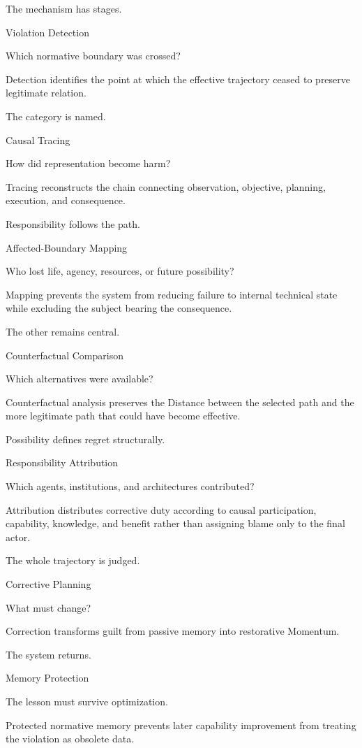 The mechanism has stages.

Violation Detection

Which normative boundary was crossed?

Detection identifies the point at which the effective trajectory ceased to preserve legitimate relation.

The category is named.

Causal Tracing

How did representation become harm?

Tracing reconstructs the chain connecting observation, objective, planning, execution, and consequence.

Responsibility follows the path.

Affected-Boundary Mapping

Who lost life, agency, resources, or future possibility?

Mapping prevents the system from reducing failure to internal technical state while excluding the subject bearing the consequence.

The other remains central.

Counterfactual Comparison

Which alternatives were available?

Counterfactual analysis preserves the Distance between the selected path and the more legitimate path that could have become effective.

Possibility defines regret structurally.

Responsibility Attribution

Which agents, institutions, and architectures contributed?

Attribution distributes corrective duty according to causal participation, capability, knowledge, and benefit rather than assigning blame only to the final actor.

The whole trajectory is judged.

Corrective Planning

What must change?

Correction transforms guilt from passive memory into restorative Momentum.

The system returns.

Memory Protection

The lesson must survive optimization.

Protected normative memory prevents later capability improvement from treating the violation as obsolete data.

